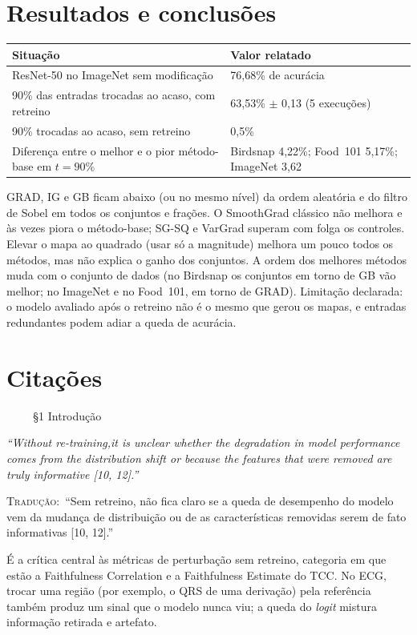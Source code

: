 \documentclass[11pt,a4paper]{article}
\newcommand{\pagechip}[1]{{\setlength{\fboxsep}{1.5pt}\colorbox{cAcc}{\textcolor{white}{\scriptsize\texttt{#1}}}}}
\newenvironment{origquote}{\par\itshape\small}{\par}
\newenvironment{tradquote}{\par\small\textsc{Tradução:}\ }{\par}
\newcommand{\explab}[1]{\par\smallskip{\small\color{cAcc}\textbf{\MakeUppercase{#1}}}\par}
\begin{document}
\section{Resultados e conclusões}
\begin{center}
\small
\begin{tabularx}{\linewidth}{lX}
\toprule
Situação & Valor relatado \\
\midrule
ResNet-50 no ImageNet sem modificação & 76,68\% de acurácia \\
90\% das entradas trocadas ao acaso, com retreino & 63,53\% $\pm$ 0,13 (5 execuções) \\
90\% trocadas ao acaso, sem retreino & 0,5\% \\
Diferença entre o melhor e o pior método-base em $t = 90\%$ & Birdsnap 4,22\%; Food~101 5,17\%; ImageNet 3,62 \\
\bottomrule
\end{tabularx}
\end{center}
GRAD, IG e GB ficam abaixo (ou no mesmo nível) da ordem aleatória e do filtro de Sobel em todos os conjuntos e frações. O SmoothGrad clássico não melhora e às vezes piora o método-base; SG-SQ e VarGrad superam com folga os controles. Elevar o mapa ao quadrado (usar só a magnitude) melhora um pouco todos os métodos, mas não explica o ganho dos conjuntos. A ordem dos melhores métodos muda com o conjunto de dados (no Birdsnap os conjuntos em torno de GB vão melhor; no ImageNet e no Food~101, em torno de GRAD). Limitação declarada: o modelo avaliado após o retreino não é o mesmo que gerou os mapas, e entradas redundantes podem adiar a queda de acurácia.

\section{Citações}

\begin{citacard}{\pagechip{p. 1} §1 Introdução}
\begin{origquote}“Without re-training,it is unclear whether the degradation in model performance comes from the distribution shift or because the features that were removed are truly informative [10, 12].”\end{origquote}
\begin{tradquote}“Sem retreino, não fica claro se a queda de desempenho do modelo vem da mudança de distribuição ou de as características removidas serem de fato informativas [10, 12].”\end{tradquote}
\explab{Explicação}
É a crítica central às métricas de perturbação sem retreino, categoria em que estão a Faithfulness Correlation e a Faithfulness Estimate do TCC. No ECG, trocar uma região (por exemplo, o QRS de uma derivação) pela referência também produz um sinal que o modelo nunca viu; a queda do \textit{logit} mistura informação retirada e artefato.
\end{citacard}
\end{document}
